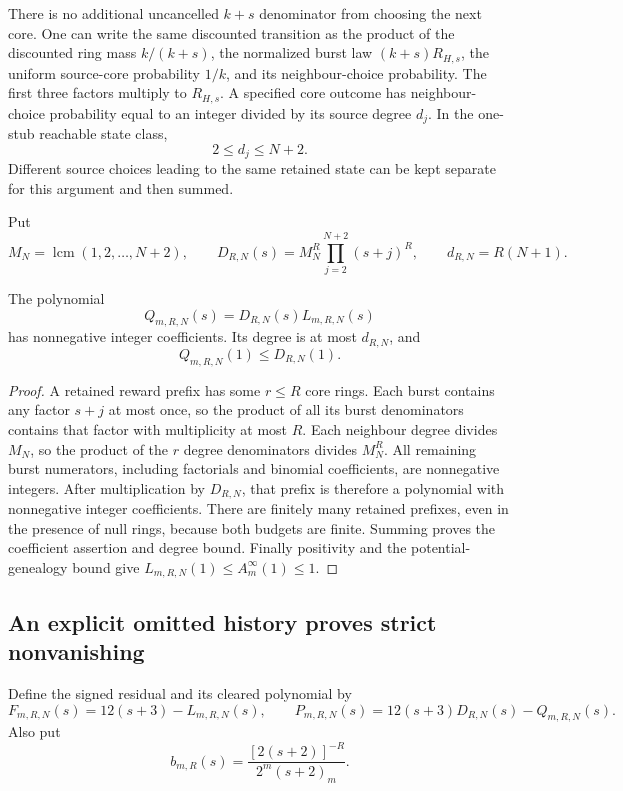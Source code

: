There is no additional uncancelled $k+s$ denominator from choosing the
next core. One can write the same discounted transition as the product
of the discounted ring mass $k/(k+s)$, the normalized burst law
$(k+s)R_{H,s}$, the uniform source-core probability $1/k$, and its
neighbour-choice probability. The first three factors multiply to
$R_{H,s}$. A specified core outcome has neighbour-choice probability
equal to an integer divided by its source degree $d_j$. In the one-stub
reachable state class,
\[
 2\le d_j\le N+2.
\]
Different source choices leading to the same retained state can be kept
separate for this argument and then summed.

Put
\[
 M_N=\operatorname{lcm}(1,2,\ldots,N+2),\qquad
 D_{R,N}(s)=M_N^R\prod_{j=2}^{N+2}(s+j)^R,
 \qquad d_{R,N}=R(N+1).
\]

\begin{lemma}\label{scp:clearer}
The polynomial
\[
 Q_{m,R,N}(s)=D_{R,N}(s)L_{m,R,N}(s)
\]
has nonnegative integer coefficients. Its degree is at most
$d_{R,N}$, and
\[
 Q_{m,R,N}(1)\le D_{R,N}(1).
\]
\end{lemma}
\begin{proof}
A retained reward prefix has some $r\le R$ core rings. Each burst
contains any factor $s+j$ at most once, so the product of all its
burst denominators contains that factor with multiplicity at most $R$.
Each neighbour degree divides $M_N$, so the product of the $r$ degree
denominators divides $M_N^R$. All remaining burst numerators, including
factorials and binomial coefficients, are nonnegative integers. After
multiplication by $D_{R,N}$, that prefix is therefore a polynomial with
nonnegative integer coefficients. There are finitely many retained
prefixes, even in the presence of null rings, because both budgets are
finite. Summing proves the coefficient assertion and degree bound.
Finally positivity and the potential-genealogy bound give
$L_{m,R,N}(1)\le A_m^\infty(1)\le1$.
\end{proof}

\subsection{An explicit omitted history proves strict nonvanishing}

Define the signed residual and its cleared polynomial by
\[
 F_{m,R,N}(s)=12(s+3)-L_{m,R,N}(s),\qquad
 P_{m,R,N}(s)=12(s+3)D_{R,N}(s)-Q_{m,R,N}(s).
\]
Also put
\[
 b_{m,R}(s)=
 \frac{[2(s+2)]^{-R}}{2^m(s+2)_m}.
\]

